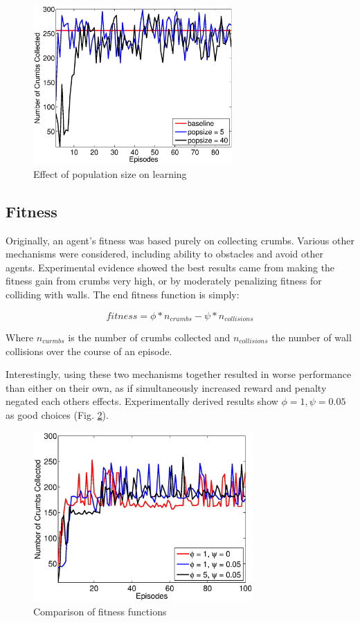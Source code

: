 \documentclass[conference]{IEEEtran}
\begin{document}

\begin{figure}[!t]
\centering
\includegraphics[width=3.0in]{./figures/neroevolution/pop_size.eps}
\caption{Effect of population size on learning}
\label{neroevolution:pop_size}
\end{figure}




\subsection{Fitness}
Originally, an agent's fitness was based purely on collecting crumbs. Various other mechanisms were considered, including ability to obstacles and avoid other agents. Experimental evidence showed the best results came from making the fitness gain from crumbs very high, or by moderately penalizing fitness for colliding with walls. The end fitness function is simply:


\[ fitness = \phi * n_{crumbs} - \psi * n_{collisions}\]

Where $n_{curmbs}$ is the number of crumbs collected and $n_{collisions}$ the number of wall collisions over the course of an episode. 
 
Interestingly, using these two mechanisms together resulted in worse performance than either on their own, as if simultaneously increased reward and penalty negated each others effects. 
Experimentally derived results show $\phi = 1, \psi = 0.05$ as good choices (Fig. \ref{neroevolution:fitness}). 

\begin{figure}[!t]
\centering
\includegraphics[width=3.3in]{./figures/neroevolution/reward.eps}
\caption{Comparison of fitness functions}
\label{neroevolution:fitness}
\end{figure}
\end{document}
